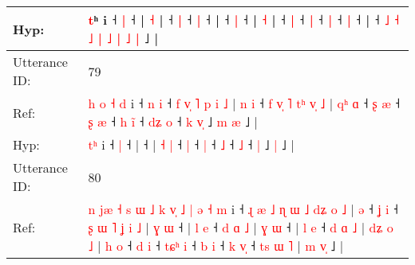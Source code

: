 \documentclass[10pt]{article}
\DeclareRobustCommand{\hl}[1]{{\textcolor{red}{#1}}}
\begin{document}
\begin{longtable}{ll}
 \\
Hyp: & \hl{}\hl{t}ʰ\hl{}\hl{}\hl{}\hl{}\hl{}\hl{}\hl{}\hl{}\hl{}\hl{}\hl{}\hl{} i\hl{}\hl{}\hl{}\hl{}\hl{}\hl{}\hl{}\hl{} ˧\hl{}\hl{}\hl{} \hl{|} ˧\hl{}\hl{}\hl{}\hl{}\hl{}\hl{}\hl{}\hl{}\hl{}\hl{}\hl{}\hl{}\hl{}\hl{}\hl{}\hl{}\hl{}\hl{}\hl{}\hl{} |\hl{}\hl{}\hl{}\hl{}\hl{} \hl{}\hl{˧} |\hl{}\hl{}\hl{}\hl{}\hl{}\hl{}\hl{}\hl{}\hl{} ˧\hl{}\hl{} \hl{|} ˧\hl{}\hl{} \hl{|} ˧ |\hl{}\hl{}\hl{}\hl{} ˧\hl{}\hl{}\hl{} \hl{|} ˧\hl{}\hl{}\hl{}\hl{}\hl{}\hl{}\hl{}\hl{}\hl{}\hl{}\hl{}\hl{}\hl{}\hl{}\hl{}\hl{}\hl{}\hl{}\hl{}\hl{} |\hl{}\hl{}\hl{}\hl{}\hl{} \hl{}\hl{˧} |\hl{}\hl{}\hl{}\hl{} ˧\hl{}\hl{} \hl{|} ˧\hl{}\hl{} \hl{|} ˧\hl{}\hl{}\hl{}\hl{} \hl{}\hl{|} ˧\hl{}\hl{} \hl{|} ˧ |\hl{}\hl{} ˧ \hl{˩} \hl{˧} \hl{˩} \hl{|} \hl{˩} \hl{|} \hl{˩} \hl{|} ˩ |
 \\
\midrule
Utterance ID: & 79 \\
Ref: & \hl{h}\hl{ }\hl{o}\hl{ }\hl{˧}\hl{ }\hl{d} i ˧\hl{ }\hl{n} \hl{i} ˧\hl{ }\hl{f}\hl{ }\hl{v}\hl{̩}\hl{ }\hl{˥}\hl{ }\hl{p}\hl{ }\hl{i}\hl{ }\hl{˩} |\hl{ }\hl{n}\hl{ }\hl{i} ˧\hl{ }\hl{f}\hl{ }\hl{v}\hl{̩}\hl{ }\hl{˥}\hl{ }\hl{t}\hl{ʰ}\hl{ }\hl{v}\hl{̩}\hl{ }\hl{˩} | \hl{q}\hl{ʰ} \hl{ɑ} ˧\hl{ }\hl{ʂ} \hl{æ} ˧\hl{ }\hl{ʂ} \hl{æ} ˧\hl{ }\hl{h} \hl{i}\hl{̃} ˧\hl{ }\hl{d}\hl{ʑ} \hl{o} ˧\hl{ }\hl{k} \hl{v}\hl{̩} ˩\hl{ }\hl{m} \hl{æ} ˩ |
 \\
Hyp: & \hl{}\hl{}\hl{}\hl{}\hl{}\hl{t}\hl{ʰ} i ˧\hl{}\hl{} \hl{|} ˧\hl{}\hl{}\hl{}\hl{}\hl{}\hl{}\hl{}\hl{}\hl{}\hl{}\hl{}\hl{}\hl{} |\hl{}\hl{}\hl{}\hl{} ˧\hl{}\hl{}\hl{}\hl{}\hl{}\hl{}\hl{}\hl{}\hl{}\hl{}\hl{}\hl{}\hl{}\hl{}\hl{} | \hl{}\hl{˧} \hl{|} ˧\hl{}\hl{} \hl{|} ˧\hl{}\hl{} \hl{|} ˧\hl{}\hl{} \hl{}\hl{˩} ˧\hl{}\hl{}\hl{} \hl{˩} ˧\hl{}\hl{} \hl{}\hl{|} ˩\hl{}\hl{} \hl{|} ˩ |
 \\
\midrule
Utterance ID: & 80 \\
Ref: & \hl{n}\hl{ }\hl{j}\hl{æ}\hl{ }\hl{˧}\hl{ }\hl{s}\hl{ }\hl{ɯ}\hl{ }\hl{˩}\hl{ }\hl{k}\hl{ }\hl{v}\hl{̩}\hl{ }\hl{˩}\hl{ }\hl{|}\hl{ }\hl{ə}\hl{ }\hl{˧}\hl{ }\hl{m} i ˧\hl{ }\hl{ɻ}\hl{ }\hl{æ}\hl{ }\hl{˩}\hl{ }\hl{ɳ}\hl{ }\hl{ɯ}\hl{ }\hl{˩}\hl{ }\hl{d}\hl{ʑ}\hl{ }\hl{o}\hl{ }\hl{˩} |\hl{ }\hl{ə} ˧\hl{ }\hl{ʝ} \hl{i} ˧\hl{ }\hl{ʂ}\hl{ }\hl{ɯ}\hl{ }\hl{˥}\hl{ }\hl{ʝ}\hl{ }\hl{i}\hl{ }\hl{˩} |\hl{ }\hl{ɣ}\hl{ }\hl{ɯ} ˧ |\hl{ }\hl{l}\hl{ }\hl{e} ˧\hl{ }\hl{d}\hl{ }\hl{ɑ}\hl{ }\hl{˩} |\hl{ }\hl{ɣ}\hl{ }\hl{ɯ} ˧ |\hl{ }\hl{l}\hl{ }\hl{e} ˧\hl{ }\hl{d}\hl{ }\hl{ɑ}\hl{ }\hl{˩} |\hl{ }\hl{d}\hl{ʑ}\hl{ }\hl{o} \hl{˩} |\hl{ }\hl{h}\hl{ }\hl{o} ˧\hl{ }\hl{d} \hl{i} ˧\hl{ }\hl{t}\hl{ɕ}\hl{ʰ} \hl{i} ˧\hl{ }\hl{b} \hl{i} ˧\hl{ }\hl{k} \hl{v}\hl{̩} ˧ \hl{t}\hl{s} \hl{ɯ} \hl{˥} | \hl{m} \hl{v}\hl{̩} ˩ |

\end{longtable}
\end{document}
